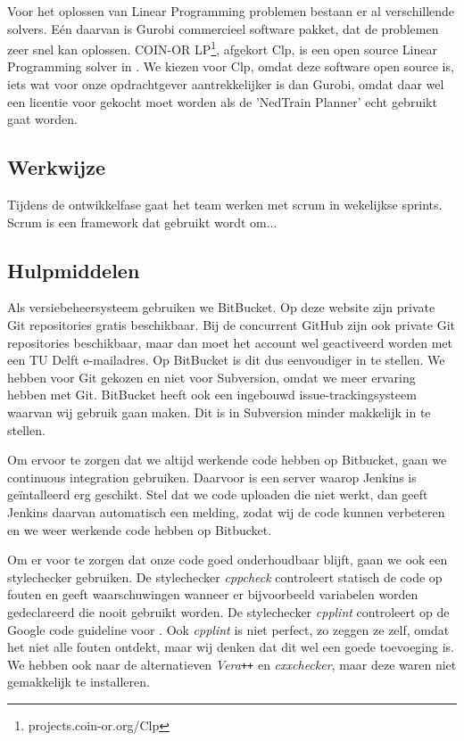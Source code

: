 Voor het oplossen van Linear Programming problemen bestaan er al verschillende solvers. E\'en daarvan is Gurobi commercieel software pakket, dat de problemen zeer snel kan oplossen. COIN-OR LP\footnote{projects.coin-or.org/Clp}, afgekort Clp, is een open source Linear Programming solver in \cpp . We kiezen voor Clp, omdat deze software open source is, iets wat voor onze opdrachtgever aantrekkelijker is dan Gurobi, omdat daar wel een licentie voor gekocht moet worden als de 'NedTrain Planner' echt gebruikt gaat worden.

\subsection{Werkwijze}
Tijdens de ontwikkelfase gaat het team werken met scrum in wekelijkse sprints. Scrum is een framework dat gebruikt wordt om...

\subsection{Hulpmiddelen}
Als versiebeheersysteem gebruiken we BitBucket. Op deze website zijn private Git repositories gratis beschikbaar. Bij de concurrent GitHub zijn ook private Git repositories beschikbaar, maar dan moet het account wel geactiveerd worden met een TU Delft e-mailadres. Op BitBucket is dit dus eenvoudiger in te stellen. We hebben voor Git gekozen en niet voor Subversion, omdat we meer ervaring hebben met Git. BitBucket heeft ook een ingebouwd issue-trackingsysteem waarvan wij gebruik gaan maken. Dit is in Subversion minder makkelijk in te stellen.

Om ervoor te zorgen dat we altijd werkende code hebben op Bitbucket, gaan we continuous integration gebruiken. Daarvoor is een server waarop Jenkins is ge\"intalleerd erg geschikt. Stel dat we code uploaden die niet werkt, dan geeft Jenkins daarvan automatisch een melding, zodat wij de code kunnen verbeteren en we weer werkende code hebben op Bitbucket.  

Om er voor te zorgen dat onze code goed onderhoudbaar blijft, gaan we ook een stylechecker gebruiken. De stylechecker \emph{cppcheck} controleert statisch de code op fouten en geeft waarschuwingen wanneer er bijvoorbeeld variabelen worden gedeclareerd die nooit gebruikt worden. De stylechecker \emph{cpplint} controleert op de Google code guideline voor \cpp. Ook \emph{cpplint} is niet perfect, zo zeggen ze zelf, omdat het niet alle fouten ontdekt, maar wij denken dat dit wel een goede toevoeging is. We hebben ook naar de alternatieven \emph{Vera\texttt{++}} en \emph{cxxchecker}, maar deze waren niet gemakkelijk te installeren.
